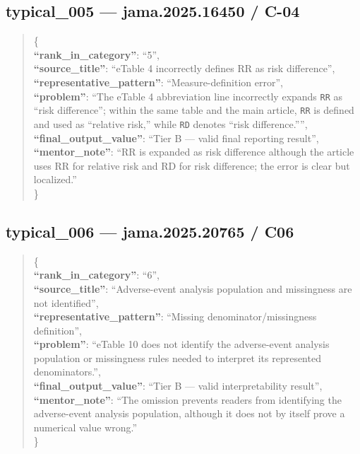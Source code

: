 \documentclass[
  letterpaper,
  9pt]{extreport}
\begin{document}
\hypertarget{typical_005--jama202516450--c-04}{%
\subsection{typical\_005 --- jama.2025.16450 /
C-04}\label{typical_005--jama202516450--c-04}}

\begin{quote}
\{\\
\textbf{``rank\_in\_category''}: ``5'',\\
\textbf{``source\_title''}: ``eTable 4 incorrectly defines RR as risk
difference'',\\
\textbf{``representative\_pattern''}: ``Measure-definition error'',\\
\textbf{``problem''}: ``The eTable 4 abbreviation line incorrectly
expands \texttt{RR} as ``risk difference''; within the same table and
the main article, \texttt{RR} is defined and used as ``relative risk,''
while \texttt{RD} denotes ``risk difference.'''',\\
\textbf{``final\_output\_value''}: ``Tier B --- valid final reporting
result'',\\
\textbf{``mentor\_note''}: ``RR is expanded as risk difference although
the article uses RR for relative risk and RD for risk difference; the
error is clear but localized.''\\
\}
\end{quote}

\hypertarget{typical_006--jama202520765--c06}{%
\subsection{typical\_006 --- jama.2025.20765 /
C06}\label{typical_006--jama202520765--c06}}

\begin{quote}
\{\\
\textbf{``rank\_in\_category''}: ``6'',\\
\textbf{``source\_title''}: ``Adverse-event analysis population and
missingness are not identified'',\\
\textbf{``representative\_pattern''}: ``Missing denominator/missingness
definition'',\\
\textbf{``problem''}: ``eTable 10 does not identify the adverse-event
analysis population or missingness rules needed to interpret its
represented denominators.'',\\
\textbf{``final\_output\_value''}: ``Tier B --- valid interpretability
result'',\\
\textbf{``mentor\_note''}: ``The omission prevents readers from
identifying the adverse-event analysis population, although it does not
by itself prove a numerical value wrong.''\\
\}
\end{quote}
\end{document}
